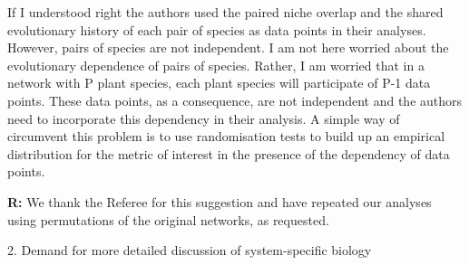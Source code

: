 \documentclass[12pt]{letter}
\newenvironment{refquote}{\bigskip \begin{it}}{\end{it}\smallskip}
\begin{document}
    \begin{refquote}

      If I understood right the authors used the paired niche overlap and the shared evolutionary history of each pair of species as data points in their analyses. However, pairs of species are not independent. I am not here worried about the evolutionary dependence of pairs of species. Rather, I am worried that in a network with P plant species, each plant species will participate of P-1 data points. These data points, as a consequence, are not independent and the authors need to incorporate this dependency in their analysis. A simple way of circumvent this problem is to use randomisation tests to build up an empirical distribution for the metric of interest in the presence of the dependency of data points.

      \end{refquote}

      \textbf{R:} We thank the Referee for this suggestion and have repeated our analyses using permutations of the original networks, as requested.


  2. Demand for more detailed discussion of system-specific biology
\end{document}
